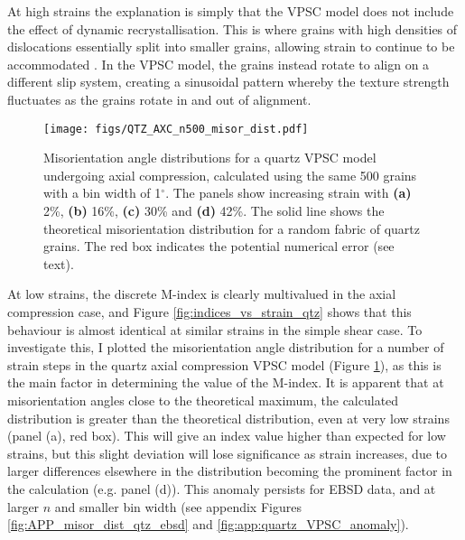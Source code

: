 \documentclass[a4paper,12pt,twoside]{report}
\numberwithin{equation}{chapter}
\begin{document}
At high strains the explanation is simply that the VPSC model does not include the effect of dynamic recrystallisation. This is where grains with high densities of dislocations essentially split into smaller grains, allowing strain to continue to be accommodated \citep{Stipp2002}. In the VPSC model, the grains instead rotate to align on a different slip system, creating a sinusoidal pattern whereby the texture strength fluctuates as the grains rotate in and out of alignment.   


\begin{figure}[t]
  \centering
    \texttt{[image: figs/QTZ\_AXC\_n500\_misor\_dist.pdf]}
  \caption[Misorientation angle distribution (quartz VPSC)]{Misorientation angle distributions for a quartz VPSC model undergoing axial compression, calculated using the same 500 grains with a bin width of 1$^{\circ}$. The panels show increasing strain with \textbf{(a)} 2\%, \textbf{(b)} 16\%, \textbf{(c)} 30\% and \textbf{(d)} 42\%. The solid line shows the theoretical misorientation distribution for a random fabric of quartz grains. The red box indicates the potential numerical error (see text).} 
  \label{fig:qtz_misorientation_dist}
\end{figure} 

At low strains, the discrete M-index is clearly multivalued in the axial compression case, and Figure \ref{fig:indices_vs_strain_qtz} shows that this behaviour is almost identical at similar strains in the simple shear case. To investigate this, I plotted the misorientation angle distribution for a number of strain steps in the quartz axial compression VPSC model (Figure \ref{fig:qtz_misorientation_dist}), as this is the main factor in determining the value of the M-index. It is apparent that at misorientation angles close to the theoretical maximum, the calculated distribution is greater than the theoretical distribution, even at very low strains (panel (a), red box). This will give an index value higher than expected for low strains, but this slight deviation will lose significance as strain increases, due to larger differences elsewhere in the distribution becoming the prominent factor in the calculation (e.g. panel (d)). This anomaly persists for EBSD data, and at larger $n$ and smaller bin width (see appendix Figures \ref{fig:APP_misor_dist_qtz_ebsd} and \ref{fig:app:quartz_VPSC_anomaly}).
\end{document}
